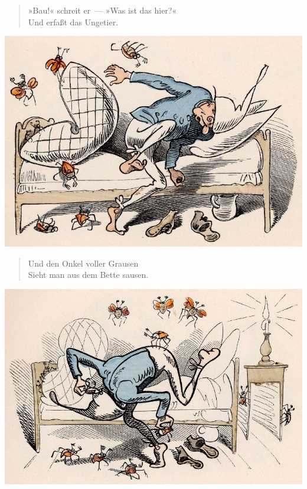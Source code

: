 \documentclass[a4paper,12pt]{article}
\begin{document}
\begin{verse}
»Bau!« schreit er~— »Was ist das hier?«\\{}
Und erfaßt das Ungetier.
\end{verse}



\begin{center}\includegraphics[scale=.7, alt={der Onkel saust}]{images/5-10.jpg}\end{center}



\begin{verse}
Und den Onkel voller Grausen\\{}
Sieht man aus dem Bette sausen.
\end{verse}



\begin{center}\includegraphics[scale=.7, alt={... denn es kriecht}]{images/5-11.jpg}\end{center}
\end{document}
